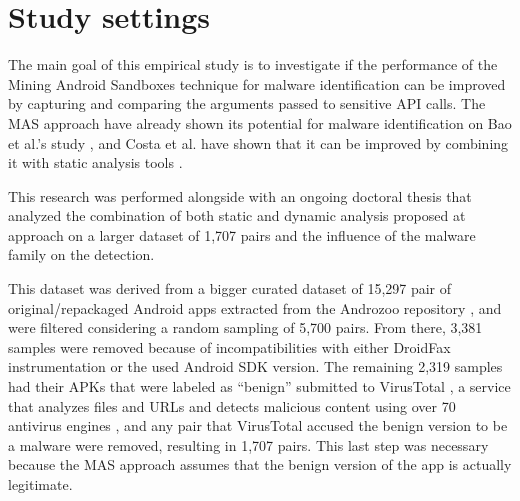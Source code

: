 \section{Study settings}


The main goal of this empirical study is to investigate if the performance of the Mining Android Sandboxes technique for malware identification can be improved by capturing and comparing the arguments passed to sensitive API calls. The MAS approach have already shown its potential for malware identification on Bao et al.'s study \cite{bao_mining_2018}, and Costa et al. have shown that it can be improved by combining it with static analysis tools \cite{costa_exploring_2022}.


This research was performed alongside with an ongoing doctoral thesis that analyzed the combination of both static and dynamic analysis proposed at \cite{costa_exploring_2022} approach on a larger dataset of 1,707 pairs and the influence of the malware family on the detection.

This dataset was derived from a bigger curated dataset of 15,297 pair of original/repackaged Android apps extracted from the Androzoo repository \cite{allix_androzoo_2016}, and were filtered considering a random sampling of 5,700 pairs. From there, 3,381 samples were removed because of incompatibilities with either DroidFax instrumentation or the used Android SDK version. The remaining 2,319 samples had their APKs that were labeled as ``benign'' submitted to VirusTotal \cite{noauthor_about_nodate}, a service that analyzes files and URLs and detects malicious content using over 70 antivirus engines \cite{khanmohammadi_empirical_2019}, and any pair that VirusTotal accused the benign version to be a malware were removed, resulting in 1,707 pairs. This last step was necessary because the MAS approach assumes that the benign version of the app is actually legitimate. %

